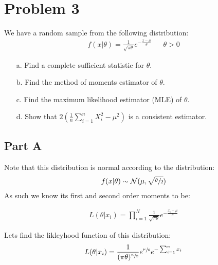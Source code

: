 \documentclass{article}
\begin{document}
\section*{Problem 3}
We have a random sample from the following distribution:
\begin{align*}
f(x|\theta) = \frac{1}{\sqrt{\pi \theta}} e^{-\frac{x-\mu}{\theta}} && \theta > 0 
\end{align*}
\begin{enumerate}
\item[a.] Find a complete sufficient statistic for $\theta$.
\item[b.] Find the method of moments estimator of $\theta$.
\item[c.] Find the maximum likelihood estimator (MLE) of $\theta$.
\item[d.] Show that $2(\frac{1}{n} \sum_{i=1}^{n} X^{2}_i - \mu^2)$ is a consistent estimator.
\end{enumerate}
\subsection*{Part A}
Note that this distribution is normal according to the distribution:
\begin{align*}
f(x|\theta) \sim \mathcal{N}(\mu,\sqrt{\sfrac{\theta}{2}})
\end{align*}
As such we know its first and second order moments to be:



\begin{align*}
L(\theta|x_i) = \prod_{i=1}^{N} \frac{1}{\sqrt{\pi \theta}} e^{-\frac{x_i-\mu}{\theta}}
\end{align*}

Lets find the likleyhood function of this distribution:
\begin{align*}
L(\theta|x_i) = \frac{1}{(\pi \theta)^{\sfrac{n}{2}}} e^{\sfrac{\mu}{\theta}} e^{-\sum_{i=1}^{n} x_i}
\end{align*}
\end{document}
